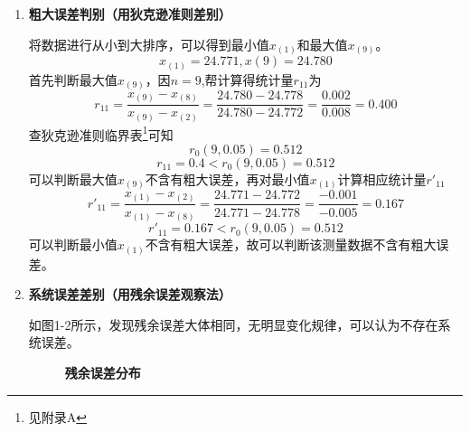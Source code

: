 \begin{enumerate}
	\item \textbf{粗大误差判别（用狄克逊准则差别）}
	
	将数据进行从小到大排序，可以得到最小值$ x_{(1)} $和最大值$ x_{(9)} $。
	\begin{equation} x_{(1)}=24.771,x{(9)}=24.780 \end{equation}
	首先判断最大值$ x_{(9)} $，因$ n=9 $,帮计算得统计量$ r_{11} $为
	\begin{equation}
	r_{11}=\frac{x_{(9)}-x_{(8)}}{x_{(9)}-x_{(2)}}=\frac{24.780-24.778}{24.780-24.772}=\frac{0.002}{0.008}=0.400
	\end{equation}
	查狄克逊准则临界表\footnote{见附录A}可知\begin{equation} r_0(9,0.05)=0.512 \end{equation}
	\begin{equation} r_{11}=0.4<r_0(9,0.05)=0.512 \end{equation}
	可以判断最大值$ x_{(9)} $不含有粗大误差，再对最小值$ x_{(1)} $计算相应统计量$ r'_{11} $
	\begin{equation}
	r'_{11}=\frac{x_{(1)}-x_{(2)}}{x_{(1)}-x_{(8)}}=\frac{24.771-24.772}{24.771-24.778}=\frac{-0.001}{-0.005}=0.167
	\end{equation}
	\begin{equation} r'_{11}=0.167<r_0(9,0.05)=0.512 \end{equation}
	可以判断最小值$ x_{(1)} $不含有粗大误差，故可以判断该测量数据不含有粗大误差。
	\item \textbf{系统误差差别（用残余误差观察法）}
	
	\qquad 如图1-2所示，发现残余误差大体相同，无明显变化规律，可以认为不存在系统误差。
	\begin{figure}[H]
		\centering
		\caption{\textbf{残余误差分布}}
	\end{figure}


\end{enumerate}
